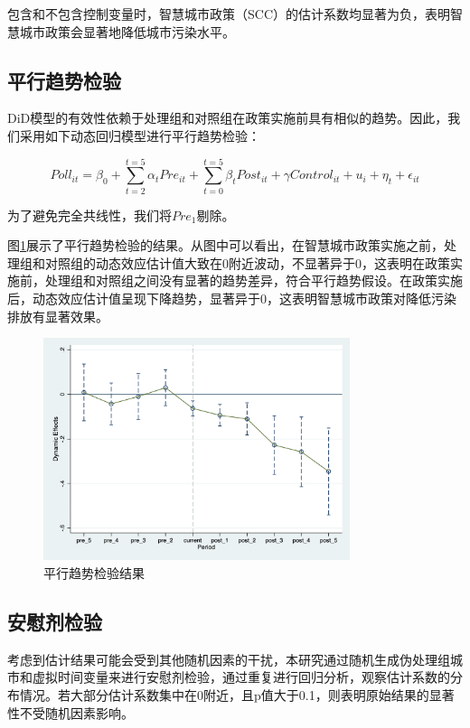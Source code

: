 \documentclass[a4paper,12pt]{article}
\begin{document}
包含和不包含控制变量时，智慧城市政策（SCC）的估计系数均显著为负，表明智慧城市政策会显著地降低城市污染水平。

\subsection{平行趋势检验}
DiD模型的有效性依赖于处理组和对照组在政策实施前具有相似的趋势。因此，我们采用如下动态回归模型进行平行趋势检验：

$$
Poll_{i t}=\beta_0+\sum_{t=2}^{t=5}\alpha_{t} Pre_{i t}+ \sum_{t=0}^{t=5} \beta_{t}Post_{it} + \gamma Control_{i t}+ u_i+ \eta_t+\epsilon_{i t}
$$

为了避免完全共线性，我们将$Pre_1$剔除。

图\ref{fig:Parallel Trend}展示了平行趋势检验的结果。从图中可以看出，在智慧城市政策实施之前，处理组和对照组的动态效应估计值大致在0附近波动，不显著异于0，这表明在政策实施前，处理组和对照组之间没有显著的趋势差异，符合平行趋势假设。在政策实施后，动态效应估计值呈现下降趋势，显著异于0，这表明智慧城市政策对降低污染排放有显著效果。

\begin{figure}[H]
    \centering
    \includegraphics[width=0.8\textwidth]{Parallel Trend.png} 
    \caption{平行趋势检验结果}
    \label{fig:Parallel Trend}  
\end{figure}



\subsection{安慰剂检验}
考虑到估计结果可能会受到其他随机因素的干扰，本研究通过随机生成伪处理组城市和虚拟时间变量来进行安慰剂检验，通过重复进行回归分析，观察估计系数的分布情况。若大部分估计系数集中在0附近，且p值大于0.1，则表明原始结果的显著性不受随机因素影响。
\end{document}
